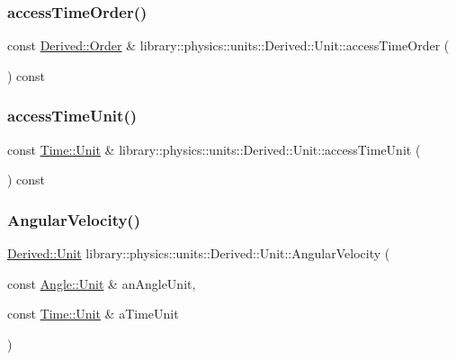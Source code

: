 \subsubsection{\texorpdfstring{access\+Time\+Order()}{accessTimeOrder()}}
{\footnotesize\ttfamily const \hyperlink{classlibrary_1_1physics_1_1units_1_1_derived_1_1_order}{Derived\+::\+Order} \& library\+::physics\+::units\+::\+Derived\+::\+Unit\+::access\+Time\+Order (\begin{DoxyParamCaption}{ }\end{DoxyParamCaption}) const}

\mbox{\label{classlibrary_1_1physics_1_1units_1_1_derived_1_1_unit_ac3537b9e186bc78b7d8ca405206cb272}} 
\subsubsection{\texorpdfstring{access\+Time\+Unit()}{accessTimeUnit()}}
{\footnotesize\ttfamily const \hyperlink{classlibrary_1_1physics_1_1units_1_1_time_ab876a6a05c9a2f28905f2753bfd64109}{Time\+::\+Unit} \& library\+::physics\+::units\+::\+Derived\+::\+Unit\+::access\+Time\+Unit (\begin{DoxyParamCaption}{ }\end{DoxyParamCaption}) const}

\mbox{\label{classlibrary_1_1physics_1_1units_1_1_derived_1_1_unit_addd355a633d2d5addd72efdd7cfebc65}} 
\subsubsection{\texorpdfstring{Angular\+Velocity()}{AngularVelocity()}}
{\footnotesize\ttfamily \hyperlink{classlibrary_1_1physics_1_1units_1_1_derived_1_1_unit}{Derived\+::\+Unit} library\+::physics\+::units\+::\+Derived\+::\+Unit\+::\+Angular\+Velocity (\begin{DoxyParamCaption}\item[{const \hyperlink{classlibrary_1_1physics_1_1units_1_1_angle_a3c329d415a61783b16ce481874cc5956}{Angle\+::\+Unit} \&}]{an\+Angle\+Unit,  }\item[{const \hyperlink{classlibrary_1_1physics_1_1units_1_1_time_ab876a6a05c9a2f28905f2753bfd64109}{Time\+::\+Unit} \&}]{a\+Time\+Unit }\end{DoxyParamCaption})\hspace{0.3cm}{\ttfamily [static]}}

